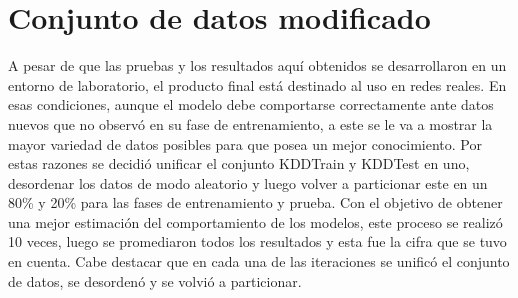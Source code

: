 \section{Conjunto de datos modificado}\label{section:modified_dataset}
A pesar de que las pruebas y los resultados aquí obtenidos se desarrollaron en un entorno de laboratorio, el producto final está destinado al uso en redes reales. En esas condiciones, aunque el modelo debe comportarse correctamente ante datos nuevos que no observó en su fase de entrenamiento, a este se le va a mostrar la mayor variedad de datos posibles para que posea un mejor conocimiento. Por estas razones se decidió unificar el conjunto KDDTrain y KDDTest en uno, desordenar los datos de modo aleatorio y luego volver a particionar este en un 80\% y 20\% para las fases de entrenamiento y prueba. Con el objetivo de obtener una mejor estimación del comportamiento de los modelos, este proceso se realizó 10 veces, luego se promediaron todos los resultados y esta fue la cifra que se tuvo en cuenta. Cabe destacar que en cada una de las iteraciones se unificó el conjunto de datos, se desordenó y se volvió a particionar.